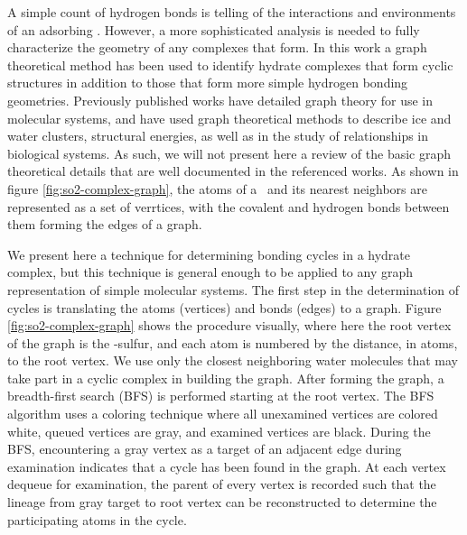 	A simple count of hydrogen bonds is telling of the interactions and environments of an adsorbing \suldiox. However, a more sophisticated analysis is needed to fully characterize the geometry of any complexes that form. In this work a graph theoretical method has been used to identify hydrate complexes that form cyclic structures in addition to those that form more simple hydrogen bonding geometries. Previously published works have detailed graph theory for use in molecular systems, and have used graph theoretical methods to describe ice and water clusters, structural energies, as well as in the study of relationships in biological systems.\cite{Huber2007,Shi2005,Radhakrishnan1991,Anick2002} As such, we will not present here a review of the basic graph theoretical details that are well documented in the referenced works. As shown in figure \ref{fig:so2-complex-graph}, the atoms of a \suldiox~and its nearest neighbors are represented as a set of verrtices, with the covalent and hydrogen bonds between them forming the edges of a graph.

	We present here a technique for determining bonding cycles in a hydrate complex, but this technique is general enough to be applied to any graph representation of simple molecular systems. The first step in the determination of cycles is translating the atoms (vertices) and bonds (edges) to a graph. Figure \ref{fig:so2-complex-graph} shows the procedure visually, where here the root vertex of the graph is the \suldiox-sulfur, and each atom is numbered by the distance, in atoms, to the root vertex. We use only the closest neighboring water molecules that may take part in a cyclic complex in building the graph. After forming the graph, a breadth-first search (BFS) is performed starting at the root vertex.\cite{Knuth1997} The BFS algorithm uses a coloring technique where all unexamined vertices are colored white, queued vertices are gray, and examined vertices are black. During the BFS, encountering a gray vertex as a target of an adjacent edge during examination indicates that a cycle has been found in the graph. At each vertex dequeue for examination, the parent of every vertex is recorded such that the lineage from gray target to root vertex can be reconstructed to determine the participating atoms in the cycle.

